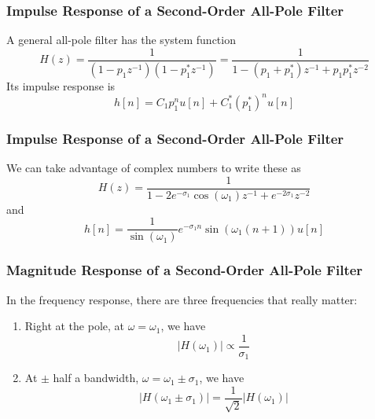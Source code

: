 \documentclass{beamer}
\begin{document}
\begin{frame}
  \frametitle{Impulse Response of a Second-Order All-Pole Filter}

  A general all-pole filter has the system function
  \[
  H(z) = \frac{1}{(1-p_1z^{-1})(1-p_1^*z^{-1})}= \frac{1}{1-(p_1+p_1^*)z^{-1}+p_1p_1^*z^{-2}}
  \]
  Its impulse response is 
  \[
  h[n] = C_1p_1^n u[n] + C_1^* (p_1^*)^n u[n]
  \]
\end{frame}

\begin{frame}
  \frametitle{Impulse Response of a Second-Order All-Pole Filter}

  We can take advantage of complex numbers to write these as
  \[
  H(z) = \frac{1}{1-2e^{-\sigma_1}\cos(\omega_1)z^{-1}+ e^{-2\sigma_1}z^{-2}}
  \]
  and
  \[
  h[n] = \frac{1}{\sin(\omega_1)} e^{-\sigma_1n}\sin(\omega_1(n+1)) u[n]
  \]
\end{frame}

\begin{frame}
  \frametitle{Magnitude Response of a Second-Order All-Pole Filter}

  In the frequency response, there are three frequencies that really matter:
  \begin{enumerate}
  \item Right at the pole, at $\omega=\omega_1$, we have
    \begin{displaymath}
      |H(\omega_1)| \propto \frac{1}{\sigma_1}
    \end{displaymath}
  \item At $\pm$ half a bandwidth, $\omega=\omega_1\pm\sigma_1$, we have
    \begin{displaymath}
      |H(\omega_1\pm\sigma_1)| =\frac{1}{\sqrt{2}}|H(\omega_1)|
    \end{displaymath}
  \end{enumerate}
\end{frame}  
\end{document}
